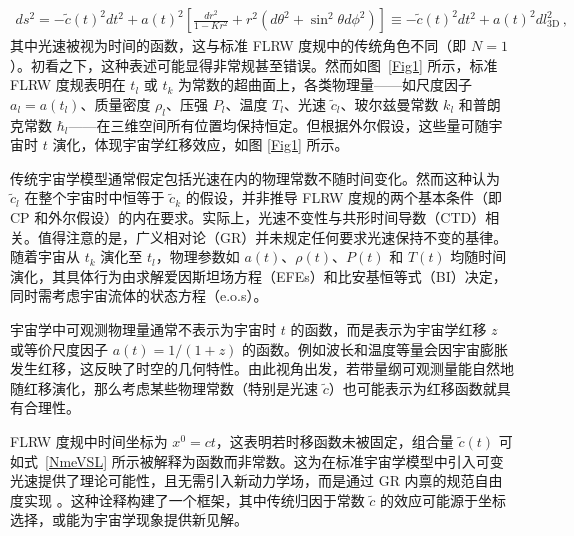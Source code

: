 \documentclass[jkps,preprint,fleqn]{revtex4}
\newcommand{\tc}{\tilde{c}}
\begin{document}
\begin{align}
ds^2 = - \tc(t)^2 dt^2 + a(t)^2 \left[ \frac{dr^2}{1-Kr^2} + r^2  \left( d \theta^2 + \sin^2 \theta d \phi^2 \right)  \right] \equiv - \tc(t)^2 dt^2 + a(t)^2 dl_{3\textrm{D}}^2 \label{dstgen} \,,
\end{align}
其中光速被视为时间的函数，这与标准 FLRW 度规中的传统角色不同（即 $N = 1$）。初看之下，这种表述可能显得非常规甚至错误。然而如图~\ref{Fig1} 所示，标准 FLRW 度规表明在 $t_l$ 或 $t_k$ 为常数的超曲面上，各类物理量——如尺度因子 $a_l = a(t_l)$、质量密度 $\rho_l$、压强 $P_l$、温度 $T_l$、光速 $\tc_l$、玻尔兹曼常数 $k_l$ 和普朗克常数 $\hbar_l$——在三维空间所有位置均保持恒定。但根据外尔假设，这些量可随宇宙时 $t$ 演化，体现宇宙学红移效应，如图 \ref{Fig1} 所示。

传统宇宙学模型通常假定包括光速在内的物理常数不随时间变化。然而这种认为 $\tc_l$ 在整个宇宙时中恒等于 $\tc_k$ 的假设，并非推导 FLRW 度规的两个基本条件（即 CP 和外尔假设）的内在要求。实际上，光速不变性与共形时间导数（CTD）相关。值得注意的是，广义相对论（GR）并未规定任何要求光速保持不变的基律。随着宇宙从 $t_k$ 演化至 $t_l$，物理参数如 $a(t)$、$\rho(t)$、$P(t)$ 和 $T(t)$ 均随时间演化，其具体行为由求解爱因斯坦场方程（EFEs）和比安基恒等式（BI）决定，同时需考虑宇宙流体的状态方程（e.o.s）。

宇宙学中可观测物理量通常不表示为宇宙时 $t$ 的函数，而是表示为宇宙学红移 $z$ 或等价尺度因子 $a(t) = 1/(1+z)$ 的函数。例如波长和温度等量会因宇宙膨胀发生红移，这反映了时空的几何特性。由此视角出发，若带量纲可观测量能自然地随红移演化，那么考虑某些物理常数（特别是光速 $\tc$）也可能表示为红移函数就具有合理性。

FLRW 度规中时间坐标为 $x^0 = ct$，这表明若时移函数未被固定，组合量 $\tc(t)$ 可如式~\eqref{NmeVSL} 所示被解释为函数而非常数。这为在标准宇宙学模型中引入可变光速提供了理论可能性，且无需引入新动力学场，而是通过 GR 内禀的规范自由度实现 \cite{Lee:2024zcu}。这种诠释构建了一个框架，其中传统归因于常数 $\tc$ 的效应可能源于坐标选择，或能为宇宙学现象提供新见解。
\end{document}
